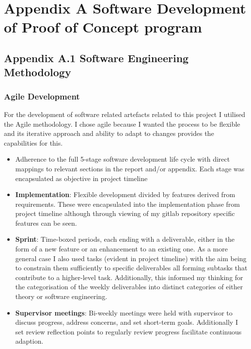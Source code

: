 \documentclass[]{final_report}
\theoremstyle{definition}
\begin{document}
\tableofcontents{}\newpage





\chapter{Appendix A Software Development of Proof of Concept program}

\section{Appendix A.1 Software Engineering Methodology}

\subsection{Agile Development}
For the development of software related artefacts related to this project I utilised the Agile methodology. I chose agile because I wanted the process to be flexible and its iterative approach and ability to adapt to changes provides the capabilities for this.
\begin{itemize}
    \item Adherence to the full 5-stage software development life cycle with direct mappings to relevant sections in the report and/or appendix. Each stage was encapsulated as objective in project timeline
    \item \textbf{Implementation}: Flexible development divided by features derived from requirements. These were encapsulated into the implementation phase from project timeline although through viewing of my gitlab repository specific features can be seen.
\item \textbf{Sprint}: Time-boxed periods,  each ending with a deliverable, either in the form of a new feature or an enhancement to an existing one. As a more general case I also used tasks (evident in project timeline) with the aim being to constrain them sufficiently to specific deliverables all forming subtasks that contribute to a higher-level task. Additionally, this informed my thinking for the categorisation of the weekly deliverables into distinct categories of either theory or software engineering.
 \item \textbf{Supervisor meetings}: Bi-weekly meetings were held with supervisor to discuss progress, address concerns, and set short-term goals. Additionally I set review reflection points to regularly review progress facilitate continuous adaption.
\end{itemize}
\end{document}
